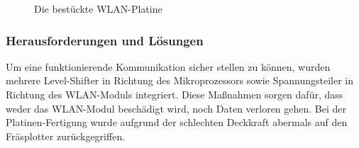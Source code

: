     \begin{figure}[tbh]
      \begin{centering}
      \par\end{centering}
      \caption{Die bestückte WLAN-Platine}
      \label{WLAN-Platine}
    \end{figure}


    \subsubsection{Herausforderungen und Lösungen}
    Um eine funktionierende Kommunikation sicher stellen zu können, wurden mehrere Level-Shifter in Richtung des Mikroprozessors sowie Spannungsteiler in Richtung des WLAN-Moduls
    integriert. Diese Maßnahmen sorgen dafür, dass weder das WLAN-Modul beschädigt wird, noch Daten verloren gehen.
    Bei der Platinen-Fertigung wurde aufgrund der schlechten Deckkraft abermals auf den Fräsplotter zurückgegriffen.
